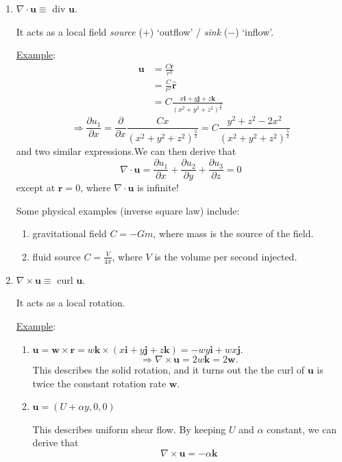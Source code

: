 \documentclass[12pt]{report}
\theoremstyle{definition}
\begin{document}
\begin{enumerate}[label = (\arabic*)]
    \item $\nabla\cdot\mathbf{u} \equiv$ div $\mathbf{u}$.

        It acts as a local field \emph{source} ($+$) `outflow' / \emph{sink} ($-$) `inflow'.

        \underline{Example}:\[
            \begin{align*}
                \mathbf{u} & = \frac{C\mathbf{r}}{r^{3}} \\
                           & = \frac{C}{r^{2}} \hat{\mathbf{r}} \\
                           & = C \frac{x\mathbf{i}+y\mathbf{j}+z\mathbf{k}}
                           {{(x^{2}+y^{2}+z^{2})}^{\frac{3}{2}}}
            \end{align*}
        \]\[
            \Rightarrow{}\frac{\partial u_1}{\partial x} 
            = \frac{\partial}{\partial x}\frac{Cx}{{(x^{2}+y^{2}+z^{2})}^{\frac{3}{2}}}
            = C \frac{y^{2}+z^{2}-2x^{2}}{{(x^{2}+y^{2}+z^{2})}^{\frac{5}{2}}}
        \]and two similar expressions.We can then derive that\[
            \nabla\cdot\mathbf{u}=\frac{\partial u_1}{\partial x}
            + \frac{\partial u_2}{\partial y} + \frac{\partial u_3}{\partial z} = 0
        \]except at $\mathbf{r} = 0$, where $\nabla\cdot\mathbf{u}$ is infinite!
        
        Some physical examples (inverse square law) include:
        \begin{enumerate}[label = (\roman*)]
            \item gravitational field $C = -Gm$, where mass is the source of the field.
            \item fluid source $C = \frac{V}{4\pi}$, where $V$ is the volume per second injected.
        \end{enumerate}
        
    \item $\nabla\times\mathbf{u}\equiv$ curl $\mathbf{u}$.

        It acts as a local rotation.

        \underline{Example}:
        \begin{enumerate}[label = (\alph*)]
            \item $\mathbf{u} = \mathbf{w}\times \mathbf{r}
                = w\mathbf{k}\times(x\mathbf{i}+y\mathbf{j}+z\mathbf{k})
                = -wy\mathbf{i} + wx\mathbf{j}$.\[
                    \Rightarrow{}\nabla\times\mathbf{u} = 2w\mathbf{k} = 2\mathbf{w}.
                \]This describes the solid rotation,
                and it turns out the the curl of $\mathbf{u}$ 
                is twice the constant rotation rate $\mathbf{w}$.

            \item $\mathbf{u} = (U+\alpha y, 0, 0)$

                This describes uniform shear flow.
                By keeping $U$ and $\alpha$ constant, we can derive that\[
                    \nabla\times\mathbf{u} = -\alpha \mathbf{k}
                \]
        \end{enumerate}
        
\end{enumerate}
\end{document}
